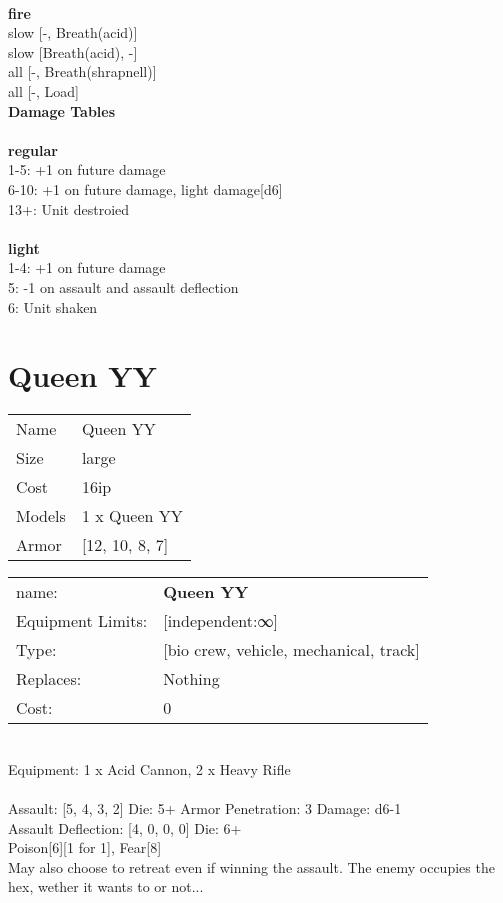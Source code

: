 \ \\ {\bf fire } \\
slow [-, Breath(acid)] \\
slow [Breath(acid), -] \\
all [-, Breath(shrapnell)] \\
all [-, Load] \\


{\bf Damage Tables} \\
\ \\ {\bf regular } \\
1-5: +1 on future damage \\
6-10: +1 on future damage, light damage[d6] \\
13+: Unit destroied \\
\ \\ {\bf light } \\
1-4: +1 on future damage \\
5: -1 on assault and assault deflection \\
6: Unit shaken \\










\pagebreak\pagebreak

\section{ Queen YY }

\begin{tabular}{ll}
  Name & Queen YY \\
  Size & large\\
  Cost & 16ip\\
  Models & 1 x Queen YY\\
  Armor & [12, 10, 8, 7]\\
\end{tabular}

\noindent 

\noindent
\begin{tabular}{ll}
name: &{\bf Queen YY } \\
Equipment Limits: &[independent:∞] \\
Type: &[bio crew, vehicle, mechanical, track] \\
Replaces: &Nothing \\
Cost: & 0\\
\end{tabular}
\ \\
Equipment: 1 x Acid Cannon, 2 x Heavy Rifle \\
\ \\
Assault: [5, 4, 3, 2] Die: 5+ Armor Penetration: 3 Damage: d6-1 \\
Assault Deflection: [4, 0, 0, 0] Die: 6+\\
\indent Poison[6][1 for 1], Fear[8]\\ 
May also choose to retreat even if winning the assault. The enemy occupies the hex, wether it wants to or not...\\ 
 
